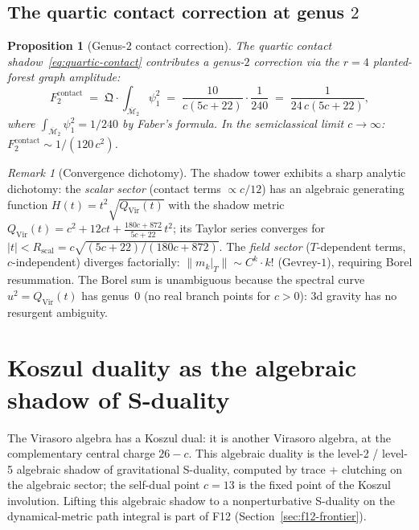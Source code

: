 \documentclass[11pt,reqno]{amsart}
\newtheorem{proposition}[theorem]{Proposition}
\theoremstyle{definition}
\theoremstyle{remark}
\newtheorem{remark}[theorem]{Remark}
\begin{document}
\subsection{The quartic contact correction at genus $2$}

\begin{proposition}[Genus-$2$ contact correction]
\label{prop:genus2-contact}
The quartic contact shadow~\eqref{eq:quartic-contact} contributes a
genus-$2$ correction via the $r = 4$ planted-forest graph amplitude:
\begin{equation}\label{eq:F2-contact}
F_2^{\mathrm{contact}} \;=\;
\mathfrak{Q} \cdot \int_{\overline{\mathcal{M}}_2} \psi_1^2
\;=\;
\frac{10}{c(5c+22)} \cdot \frac{1}{240}
\;=\;
\frac{1}{24\,c(5c+22)},
\end{equation}
where $\int_{\overline{\mathcal{M}}_2}\psi_1^2 = 1/240$ by Faber's
formula. In the semiclassical limit $c \to \infty$:
$F_2^{\mathrm{contact}} \sim 1/(120\,c^2)$.
\end{proposition}

\begin{remark}[Convergence dichotomy]
\label{rem:convergence}
The shadow tower exhibits a sharp analytic dichotomy: the
\emph{scalar sector} (contact terms $\propto c/12$) has an algebraic
generating function $H(t) = t^2\sqrt{Q_{\mathrm{Vir}}(t)}$ with the
shadow metric $Q_{\mathrm{Vir}}(t) = c^2 + 12ct
+ \frac{180c+872}{5c+22}\,t^2$; its Taylor series converges for
$|t| < R_{\mathrm{scal}} = c\sqrt{(5c+22)/(180c+872)}$. The
\emph{field sector} ($T$-dependent terms, $c$-independent) diverges
factorially: $\|m_k|_T\| \sim C^k \cdot k!$ (Gevrey-$1$), requiring
Borel resummation. The Borel sum is unambiguous because the spectral
curve $u^2 = Q_{\mathrm{Vir}}(t)$ has genus~$0$ (no real branch
points for $c > 0$): 3d gravity has no resurgent ambiguity.
\end{remark}

\section{Koszul duality as the algebraic shadow of S-duality}
\label{sec:koszul-s-duality}

The Virasoro algebra has a Koszul dual: it is another Virasoro
algebra, at the complementary central charge $26 - c$. This
algebraic duality is the level-2 / level-5 algebraic shadow of
gravitational S-duality, computed by trace + clutching on the
algebraic sector; the self-dual point $c = 13$ is the fixed point
of the Koszul involution. Lifting this algebraic shadow to a
nonperturbative S-duality on the dynamical-metric path integral
is part of F12 (Section~\ref{sec:f12-frontier}).
\end{document}
